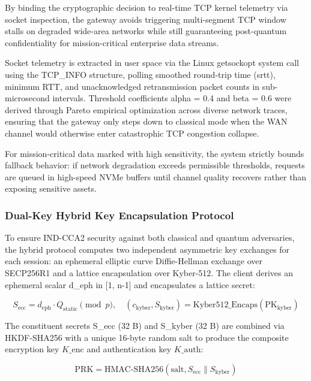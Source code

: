 \documentclass[5p,times]{elsarticle}
\begin{document}
By binding the cryptographic decision to real-time TCP kernel telemetry via socket inspection, the gateway avoids triggering multi-segment TCP window stalls on degraded wide-area networks while still guaranteeing post-quantum confidentiality for mission-critical enterprise data streams.

Socket telemetry is extracted in user space via the Linux getsockopt system call using the TCP\_INFO structure, polling smoothed round-trip time (srtt), minimum RTT, and unacknowledged retransmission packet counts in sub-microsecond intervals. Threshold coefficients alpha = 0.4 and beta = 0.6 were derived through Pareto empirical optimization across diverse network traces, ensuring that the gateway only steps down to classical mode when the WAN channel would otherwise enter catastrophic TCP congestion collapse.

For mission-critical data marked with high sensitivity, the system strictly bounds fallback behavior: if network degradation exceeds permissible thresholds, requests are queued in high-speed NVMe buffers until channel quality recovers rather than exposing sensitive assets.


\subsubsection{Dual-Key Hybrid Key Encapsulation Protocol}

To ensure IND-CCA2 security against both classical and quantum adversaries, the hybrid protocol computes two independent asymmetric key exchanges for each session: an ephemeral elliptic curve Diffie-Hellman exchange over SECP256R1 and a lattice encapsulation over Kyber-512. The client derives an ephemeral scalar d\_eph in [1, n-1] and encapsulates a lattice secret:

\begin{equation}
  S_{\text{ecc}} = d_{\text{eph}} \cdot Q_{\text{static}} \pmod{p}, \quad (c_{\text{kyber}}, S_{\text{kyber}}) = \text{Kyber512\_Encaps}(\text{PK}_{\text{kyber}})
\end{equation}

The constituent secrets S\_ecc (32 B) and S\_kyber (32 B) are combined via HKDF-SHA256 with a unique 16-byte random salt to produce the composite encryption key $K\_{\text{enc}}$ and authentication key $K\_{\text{auth}}$:

\begin{equation}
  \text{PRK} = \text{HMAC-SHA256}(\text{salt}, S_{\text{ecc}} \parallel S_{\text{kyber}})
\end{equation}
\end{document}
